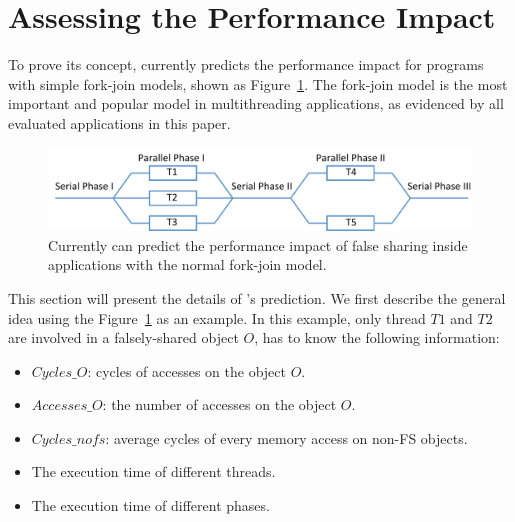 \section{Assessing the Performance Impact}

\label{sec:predictimprove}


To prove its concept, \cheetah{} currently predicts the performance impact for programs with simple fork-join models, shown as Figure~\ref{fig:forkjoinmodel}. 
The fork-join model is the most important and popular model in multithreading applications, as evidenced by all evaluated applications in this paper. 

\begin{figure}[ht!]
\begin{center}
\includegraphics[width=6.5in]{figure/forkjoin}
\end{center}
\caption{Currently \Cheetah{} can predict the performance impact of false sharing inside applications with the normal fork-join model.
\label{fig:forkjoinmodel}}
\end{figure}



This section will present the details of \cheetah{}'s prediction. We first describe the general idea using the Figure~\ref{fig:forkjoinmodel} as an example. In this example, only thread $T1$ and $T2$ are involved in a falsely-shared object $O$, \cheetah{} has to know the following information:

\begin{itemize}
\item $Cycles\_O$: cycles of accesses on the object $O$.
\item $Accesses\_O$: the number of accesses on the object $O$.  
\item $Cycles\_{nofs}$: average cycles of every memory access on non-FS objects. 
\item The execution time of different threads.  
\item The execution time of different phases. 
\end{itemize}

